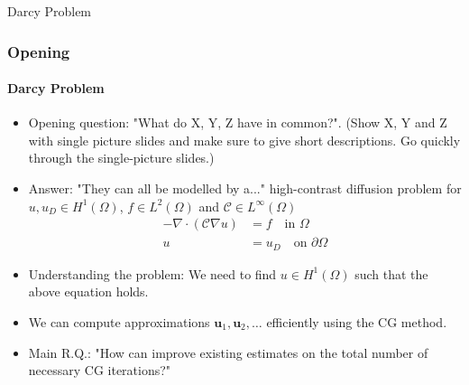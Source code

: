 \begin{frame}[label=opening]{Darcy Problem}
    \frametitle{Opening}
    \framesubtitle{Darcy Problem}
    \begin{itemize}
        \item<1-> Opening question: "What do X, Y, Z have in common?". (Show X, Y and Z with single picture slides and make sure to give short descriptions. Go quickly through the single-picture slides.)
        \item<2-> Answer: "They can all be modelled by a..." high-contrast diffusion problem for $u, u_D \in H^1(\Omega)$, $f\in L^2(\Omega)$ and $\mathcal{C}\in L^{\infty}(\Omega)$
            \begin{equation*}
                \begin{aligned}
                    -\nabla\cdot\left(\mathcal{C}\nabla u\right) & = f \quad \text{in } \Omega           \\
                    u                                            & = u_D \quad \text{on } \partial\Omega
                \end{aligned}
            \end{equation*}
        \item<3-> Understanding the problem: We need to find $u \in H^1(\Omega)$ such that the above equation holds.
        \item<4-> We can compute approximations $\mathbf{u}_1, \mathbf{u}_2, \ldots$ efficiently using the CG method.
        \item<5-> Main R.Q.: "How can improve existing estimates on the total number of necessary CG iterations?"
    \end{itemize}
\end{frame}